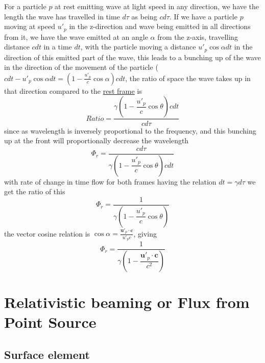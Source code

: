 For a particle $p$ at rest emitting wave at light speed in any direction, we have the length the wave has travelled in time $d\tau$ as being $cd\tau$.
If we have a particle $p$ moving at speed $u'_p$ in the z-direction and wave being emitted in all directions from it, we have the wave emitted at an angle $\alpha$ from the z-axis, travelling distance $cdt$ in a time $dt$, with the particle moving a distance $ u'_p \cos\alpha dt$ in the direction of this emitted part of the wave, this leads to a bunching up of the wave in the direction of the movement of the particle ($cdt - u'_p \cos\alpha dt= (1-\frac{u'_p}{c}\cos\alpha)cdt$, the ratio of space the wave takes up in that direction compared to the \hyperlink{def-proper-frame}{rest frame} is
\begin{equation}
	Ratio = \frac{ \gamma \left(1-\dfrac{u'_p}{c}  \cos\theta \right) c dt}{c d\tau}
\end{equation}
since as wavelength is inversely proportional to the frequency, and this bunching up at the front will proportionally decrease the wavelength
\begin{equation}
	\Phi_r = \frac{c d\tau}{ \gamma \left(1-\dfrac{u'_p}{c}  \cos\theta \right) c dt}
\end{equation}
with rate of change in time flow for both frames having the relation $dt=\gamma d\tau$ we get the ratio of this
\begin{equation}
	\Phi_r = \frac{1}{ \gamma \left(1-\dfrac{u'_p}{c}  \cos\theta \right)}
\end{equation}
the vector cosine relation is $\cos\alpha = \frac{\mathbf{u}'_p \cdot \mathbf{c}}{u'_p c}$, giving
\begin{equation}
	\Phi_r = \frac{1}{ \gamma \left(1-\dfrac{\mathbf{u}'_p \cdot \mathbf{c}}{ c^2} \right)}
\end{equation}

\section{Relativistic beaming or Flux from Point Source}

\subsection{Surface element}

